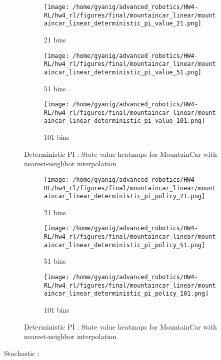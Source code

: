 \documentclass{article}
\begin{document}
\begin{figure}[h]
    \centering
    \begin{subfigure}{0.32\textwidth}
        \texttt{[image: /home/gyanig/advanced\_robotics/HW4-RL/hw4\_rl/figures/final/mountaincar\_linear/mountaincar\_linear\_deterministic\_pi\_value\_21.png]}
        \caption{21 bins}
    \end{subfigure}
    \begin{subfigure}{0.32\textwidth}
        \texttt{[image: /home/gyanig/advanced\_robotics/HW4-RL/hw4\_rl/figures/final/mountaincar\_linear/mountaincar\_linear\_deterministic\_pi\_value\_51.png]}
        \caption{51 bins}
    \end{subfigure}
    \begin{subfigure}{0.32\textwidth}
        \texttt{[image: /home/gyanig/advanced\_robotics/HW4-RL/hw4\_rl/figures/final/mountaincar\_linear/mountaincar\_linear\_deterministic\_pi\_value\_101.png]}
        \caption{101 bins}
    \end{subfigure}
    \caption{Deterministic PI : State value heatmaps for MountainCar with nearest-neighbor interpolation}
\end{figure}
\begin{figure}[h]
    \centering
    \begin{subfigure}{0.32\textwidth}
        \texttt{[image: /home/gyanig/advanced\_robotics/HW4-RL/hw4\_rl/figures/final/mountaincar\_linear/mountaincar\_linear\_deterministic\_pi\_policy\_21.png]}
        \caption{21 bins}
    \end{subfigure}
    \begin{subfigure}{0.32\textwidth}
        \texttt{[image: /home/gyanig/advanced\_robotics/HW4-RL/hw4\_rl/figures/final/mountaincar\_linear/mountaincar\_linear\_deterministic\_pi\_policy\_51.png]}
        \caption{51 bins}
    \end{subfigure}
    \begin{subfigure}{0.32\textwidth}
        \texttt{[image: /home/gyanig/advanced\_robotics/HW4-RL/hw4\_rl/figures/final/mountaincar\_linear/mountaincar\_linear\_deterministic\_pi\_policy\_101.png]}
        \caption{101 bins}
    \end{subfigure}
    \caption{Deterministic PI : State value heatmaps for MountainCar with nearest-neighbor interpolation}
\end{figure}
Stochastic :
\end{document}

